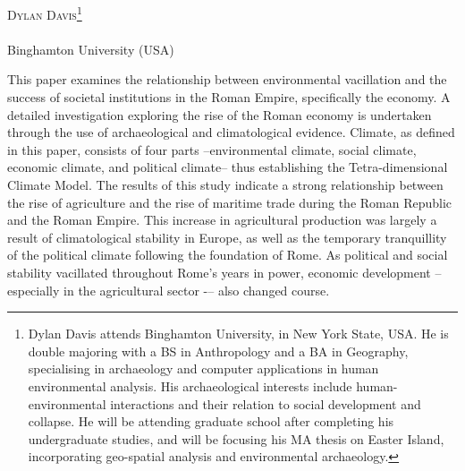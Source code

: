 \openingarticle
\def\ppages{\pagerange{davis:firstpage}{davis:lastpage}}
\def\authormail{ddavis17@binghamton.edu}
\def\shorttitle{An Analysis of the Roman Agroeconomy}
\def\maintitle{Tetra-dimensional Climate and its Effects  
	on the Roman State: An Archaeological Analysis of the 
	Roman Agroeconomy}
\def\shortauthor{Dylan Davis}
\def\thanknote{\footnote{Dylan Davis attends Binghamton University, in New York State, USA. He is double majoring with a BS in Anthropology and a BA in Geography, specialising in archaeology and computer applications in human environmental analysis. His archaeological interests include human-environmental interactions and their relation to social development and collapse. He will be attending graduate school after completing his undergraduate studies, and will be focusing his MA thesis on Easter Island, incorporating geo-spatial analysis and environmental archaeology.}}
\def\affiliation{Binghamton University (USA)}
\begin{center}
	{\Large\scshape\shortauthor \thanknote}\\[1em]
	\email \\%
	\affiliation
\end{center}
\vspace{3em}
\midarticle
\label{davis:firstpage}

	\begin{myabstract}
This paper examines the relationship between environmental vacillation and the success of societal institutions in the Roman Empire, specifically the economy. A detailed investigation exploring the rise of the Roman economy is undertaken through the use of archaeological and climatological evidence. Climate, as defined in this paper, consists of four parts –environmental climate, social climate, economic climate, and political climate– thus establishing the Tetra-dimensional Climate Model. The results of this study indicate a strong relationship between the rise of agriculture and the rise of maritime trade during the Roman Republic and the Roman Empire. This increase in agricultural production was largely a result of climatological stability in Europe, as well as the temporary tranquillity of the political climate following the foundation of Rome. As political and social stability vacillated throughout Rome’s years in power, economic development -- especially in the agricultural sector -– also changed course.


	\end{myabstract}
	

